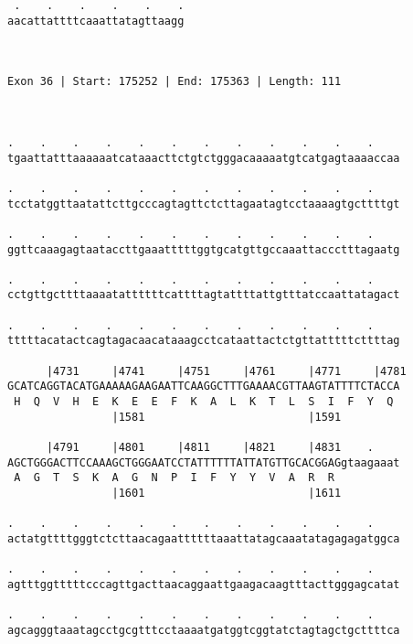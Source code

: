 \documentclass{article}
\begin{document}
\begin{Verbatim}
 .    .    .    .    .    .
aacattattttcaaattatagttaagg
                           
                           
 
Exon 36 | Start: 175252 | End: 175363 | Length: 111



.    .    .    .    .    .    .    .    .    .    .    .    
tgaattatttaaaaaatcataaacttctgtctgggacaaaaatgtcatgagtaaaaccaa
                                                            
.    .    .    .    .    .    .    .    .    .    .    .    
tcctatggttaatattcttgcccagtagttctcttagaatagtcctaaaagtgcttttgt
                                                            
.    .    .    .    .    .    .    .    .    .    .    .    
ggttcaaagagtaataccttgaaatttttggtgcatgttgccaaattaccctttagaatg
                                                            
.    .    .    .    .    .    .    .    .    .    .    .    
cctgttgcttttaaaatattttttcattttagtattttattgtttatccaattatagact
                                                            
.    .    .    .    .    .    .    .    .    .    .    .    
tttttacatactcagtagacaacataaagcctcataattactctgttatttttcttttag
                                                            
      |4731     |4741     |4751     |4761     |4771     |4781
GCATCAGGTACATGAAAAAGAAGAATTCAAGGCTTTGAAAACGTTAAGTATTTTCTACCA
 H  Q  V  H  E  K  E  E  F  K  A  L  K  T  L  S  I  F  Y  Q 
                |1581                         |1591         
  
      |4791     |4801     |4811     |4821     |4831    .    
AGCTGGGACTTCCAAAGCTGGGAATCCTATTTTTTATTATGTTGCACGGAGgtaagaaat
 A  G  T  S  K  A  G  N  P  I  F  Y  Y  V  A  R  R          
                |1601                         |1611         
  
.    .    .    .    .    .    .    .    .    .    .    .    
actatgttttgggtctcttaacagaattttttaaattatagcaaatatagagagatggca
                                                            
.    .    .    .    .    .    .    .    .    .    .    .    
agtttggtttttcccagttgacttaacaggaattgaagacaagtttacttgggagcatat
                                                            
.    .    .    .    .    .    .    .    .    .    .    .    
agcagggtaaatagcctgcgtttcctaaaatgatggtcggtatctagtagctgcttttca
                                                            

\end{Verbatim}
\end{document}
